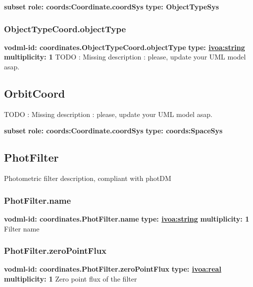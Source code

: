     \noindent \textbf{subset} \newline
    \indent   \textbf{role: coords:Coordinate.coordSys} \newline
    \indent   \textbf{type: ObjectTypeSys} \newline


    \subsubsection{ObjectTypeCoord.objectType}
      \textbf{vodml-id: coordinates.ObjectTypeCoord.objectType} \newline
      \textbf{type: \hyperref[sect:ivoa]{ivoa:string}} \newline
      \textbf{multiplicity: 1} \newline 
      TODO : Missing description : please, update your UML model asap.

  \subsection{OrbitCoord}
  \label{sect:coordinates.OrbitCoord}
    TODO : Missing description : please, update your UML model asap.

    \noindent \textbf{subset} \newline
    \indent   \textbf{role: coords:Coordinate.coordSys} \newline
    \indent   \textbf{type: coords:SpaceSys} \newline


  \subsection{PhotFilter}
  \label{sect:coordinates.PhotFilter}
    Photometric filter description, compliant with photDM

    \subsubsection{PhotFilter.name}
      \textbf{vodml-id: coordinates.PhotFilter.name} \newline
      \textbf{type: \hyperref[sect:ivoa]{ivoa:string}} \newline
      \textbf{multiplicity: 1} \newline 
      Filter name

    \subsubsection{PhotFilter.zeroPointFlux}
      \textbf{vodml-id: coordinates.PhotFilter.zeroPointFlux} \newline
      \textbf{type: \hyperref[sect:ivoa]{ivoa:real}} \newline
      \textbf{multiplicity: 1} \newline 
      Zero point flux of the filter

